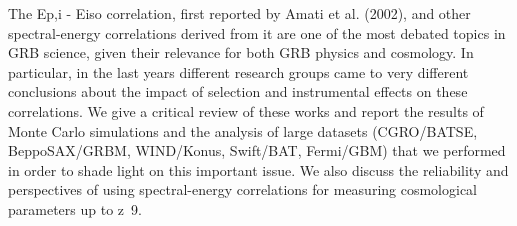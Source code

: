 


\bigskip



\bigskip

\noindent The Ep,i - Eiso correlation, first reported by Amati et al. (2002), and other spectral-energy correlations derived from it are one of the most debated topics in GRB science, given their relevance for both GRB physics and cosmology. In particular, in the last years different research groups came to very different conclusions about the impact of selection and instrumental effects on these correlations. We give a critical review of these works and report the results of Monte Carlo simulations and the analysis of large datasets (CGRO/BATSE, BeppoSAX/GRBM, WIND/Konus, Swift/BAT, Fermi/GBM) that we performed in order to shade light on this important issue. We also discuss the reliability and perspectives of using spectral-energy correlations for measuring cosmological parameters up to z~9.
